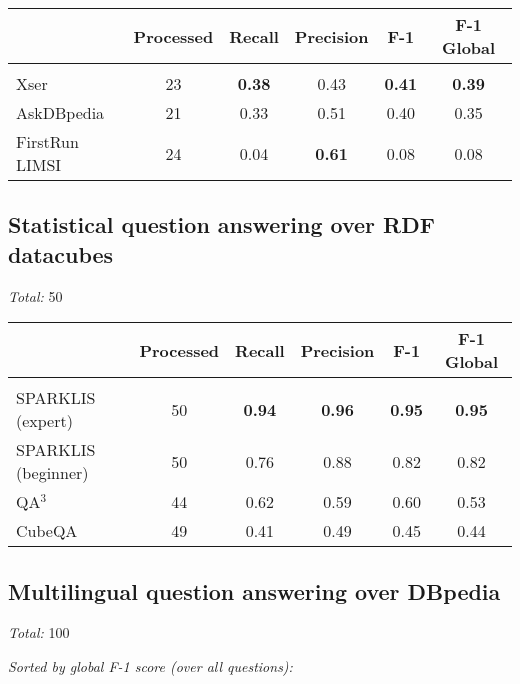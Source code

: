 \documentclass{article}
\begin{document}
\begin{tabular}{p{4cm}ccccc}
& Processed & Recall & Precision & F-1 & F-1 Global \\
\hline \\[1ex]
Xser           & 23 & \textbf{0.38} & 0.43 & \textbf{0.41} & \textbf{0.39} \\
AskDBpedia     & 21 & 0.33 & 0.51 & 0.40 & 0.35 \\
FirstRun LIMSI & 24 & 0.04 & \textbf{0.61} & 0.08 & 0.08 \\
\end{tabular}

\vspace{1cm}

\subsection*{Statistical question answering over RDF datacubes}

\emph{Total:} 50

\vspace{.6cm}

\begin{tabular}{p{4cm}ccccc}
& Processed & Recall & Precision & F-1 & F-1 Global \\
\hline \\[1ex]
SPARKLIS (expert)   & 50 & \textbf{0.94} & \textbf{0.96} & \textbf{0.95} & \textbf{0.95} \\
SPARKLIS (beginner) & 50 & 0.76 & 0.88 & 0.82 & 0.82 \\
QA$^3$              & 44 & 0.62 & 0.59 & 0.60 & 0.53 \\
CubeQA              & 49 & 0.41 & 0.49 & 0.45 & 0.44 \\
\end{tabular}

\newpage

\subsection*{Multilingual question answering over DBpedia}

\emph{Total:} 100

\vspace{.6cm}

\emph{Sorted by global F-1 score (over all questions):}

\vspace{.6cm}
\end{document}
